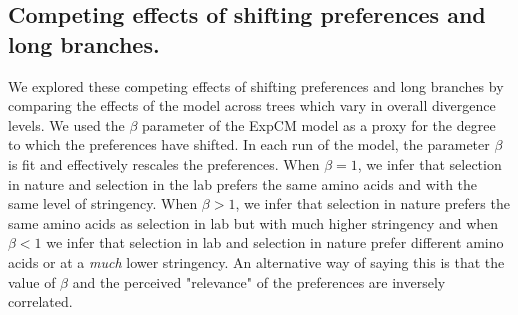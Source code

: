\documentclass[11pt]{article}
\begin{document}
\subsection{Competing effects of shifting preferences and long branches.}
We explored these competing effects of shifting preferences and long branches by comparing the effects of the model across trees which vary in overall divergence levels. 
We used the $\beta$ parameter of the ExpCM model as a proxy for the degree to which the preferences have shifted. 
In each run of the model, the parameter $\beta$ is fit and effectively rescales the preferences. 
When $\beta = 1$, we infer that selection in nature and selection in the lab prefers the same amino acids and with the same level of stringency. 
When $\beta > 1$, we infer that selection in nature prefers the same amino acids as selection in lab but with much higher stringency and when $\beta < 1$ we infer that selection in lab and selection in nature prefer different amino acids or at a \textit{much} lower stringency. 
An alternative way of saying this is that the value of $\beta$ and the perceived "relevance" of the preferences are inversely correlated. 
\end{document}
